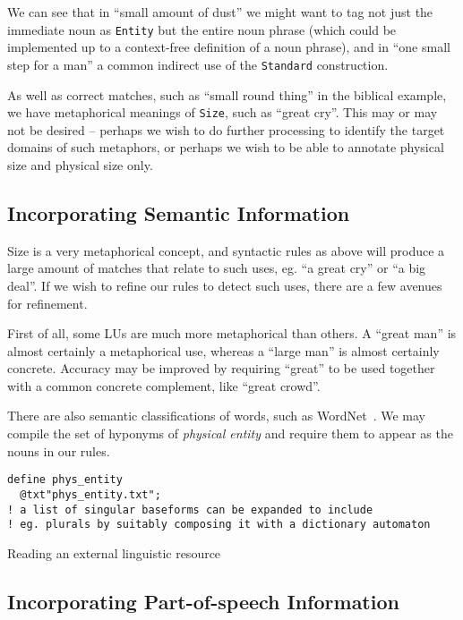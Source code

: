 \documentclass{llncs}
\begin{document}
We can see that in ``small amount of dust'' we might want to
tag not just the immediate noun as \verb+Entity+ but the entire noun phrase
(which could be implemented up to a context-free definition of a noun phrase),
and in ``one small step for a man'' a common indirect use of the \verb+Standard+
construction.

As well as correct matches, such as ``small round thing'' in the biblical
example, we have metaphorical meanings of \verb+Size+, such as ``great cry''.
This may or may not be desired -- perhaps we wish to do further processing to
identify the target domains of such metaphors, or perhaps we wish to be able
to annotate physical size and physical size only.

\subsection{Incorporating Semantic Information}

Size is a very metaphorical concept, and syntactic rules as above will produce a large amount of matches that relate to such uses, eg. ``a great cry'' or ``a big deal''. If we wish to refine our rules to detect such uses, there are a few avenues for refinement.

First of all, some LUs are much more metaphorical than others. A ``great man'' is almost certainly a metaphorical use, whereas a ``large man'' is almost certainly concrete. Accuracy may be improved by requiring ``great'' to be used together with a common concrete complement, like ``great crowd''.

There are also semantic classifications of words, such as WordNet~\cite{wordnet}. We may compile the set of hyponyms of \emph{physical entity} and require them to appear as the nouns in our rules.

\begin{table}[h]
\small
\begin{framed}
\begin{verbatim}
define phys_entity
  @txt"phys_entity.txt";
! a list of singular baseforms can be expanded to include
! eg. plurals by suitably composing it with a dictionary automaton
\end{verbatim}
\end{framed}
\normalsize
\caption{Reading an external linguistic resource}
\end{table}

\subsection{Incorporating Part-of-speech Information}
\end{document}
